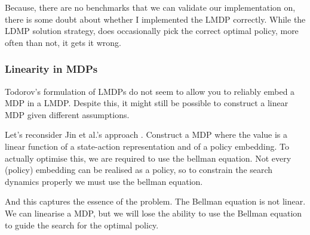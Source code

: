 
Because, there are no benchmarks that we can validate our implementation on,
there is some doubt about whether I implemented the LMDP correctly. While the
LDMP solution strategy, does occasionally pick the correct optimal policy, more often than not,
it gets it wrong.

\newpage

\subsubsection{Linearity in MDPs}

Todorov's formulation of LMDPs do not seem to allow you to reliably embed a MDP in a LMDP.
Despite this, it might still be possible to construct a linear MDP given different assumptions.

Let's reconsider Jin et al.'s approach \cite{Wang}. Construct a MDP where the value is a
linear function of a state-action representation and of a policy embedding.
To actually optimise this, we are required to use the bellman equation.
Not every (policy) embedding can be realised as a policy, so to constrain the search dynamics properly
we must use the bellman equation.

And this captures the essence of the problem. The Bellman equation is not linear.
We can linearise a MDP, but we will lose the ability to use the Bellman equation
to guide the search for the optimal policy.



